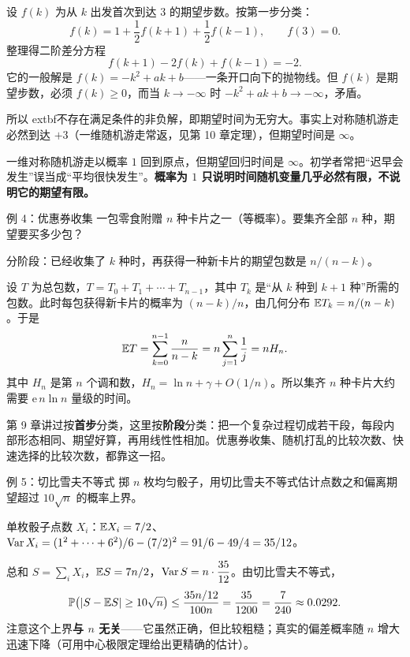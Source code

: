 \sol 设 $f(k)$ 为从 $k$ 出发首次到达 $3$ 的期望步数。按第一步分类：
\[
f(k)=1+\frac12 f(k+1)+\frac12 f(k-1),\qquad f(3)=0.
\]
整理得二阶差分方程
\[
f(k+1)-2f(k)+f(k-1)=-2.
\]
它的一般解是 $f(k)=-k^2+ak+b$——一条开口向下的抛物线。但 $f(k)$ 是期望步数，必须 $f(k)\ge0$，而当 $k\to-\infty$ 时 $-k^2+ak+b\to-\infty$，矛盾。

所以	extbf{不存在满足条件的非负解}，即期望时间为无穷大。事实上对称随机游走必然到达 $+3$（一维随机游走常返，见第 10 章定理），但期望时间是 $\infty$。

\begin{pitfall}
一维对称随机游走以概率 $1$ 回到原点，但期望回归时间是 $\infty$。初学者常把“迟早会发生”误当成“平均很快发生”。\textbf{概率为 $1$ 只说明时间随机变量几乎必然有限，不说明它的期望有限。}
\end{pitfall}

\begin{problem}{例 4：优惠券收集}
一包零食附赠 $n$ 种卡片之一（等概率）。要集齐全部 $n$ 种，期望要买多少包？
\end{problem}
\hint 分阶段：已经收集了 $k$ 种时，再获得一种新卡片的期望包数是 $n/(n-k)$。

\sol 设 $T$ 为总包数，$T=T_0+T_1+\cdots+T_{n-1}$，其中 $T_k$ 是“从 $k$ 种到 $k+1$ 种”所需的包数。此时每包获得新卡片的概率为 $(n-k)/n$，由几何分布 $\mathbb E T_k=n/(n-k)$。于是
\[
\mathbb E T=\sum_{k=0}^{n-1}\frac{n}{n-k}=n\sum_{j=1}^{n}\frac1j=nH_n.
\]
其中 $H_n$ 是第 $n$ 个调和数，$H_n=\ln n+\gamma+O(1/n)$。所以集齐 $n$ 种卡片大约需要 $\mathrm e\,n\ln n$ 量级的时间。

\begin{teach}
第 9 章讲过按\textbf{首步}分类，这里按\textbf{阶段}分类：把一个复杂过程切成若干段，每段内部形态相同、期望好算，再用线性性相加。优惠券收集、随机打乱的比较次数、快速选择的比较次数，都靠这一招。
\end{teach}

\begin{problem}{例 5：切比雪夫不等式}
掷 $n$ 枚均匀骰子，用切比雪夫不等式估计点数之和偏离期望超过 $10\sqrt n$ 的概率上界。
\end{problem}
\hint 单枚骰子点数 $X_i$：$\mathbb E X_i=7/2$、$\operatorname{Var} X_i=(1^2+\cdots+6^2)/6-(7/2)^2=91/6-49/4=35/12$。

\sol 总和 $S=\sum_iX_i$，$\mathbb E S=7n/2$，$\operatorname{Var} S=n\cdot\dfrac{35}{12}$。由切比雪夫不等式，
\[
\mathbb P\bigl(|S-\mathbb E S|\ge10\sqrt n\bigr)\le\frac{35n/12}{100n}=\frac{35}{1200}=\frac7{240}\approx0.0292.
\]
注意这个上界\textbf{与 $n$ 无关}——它虽然正确，但比较粗糙；真实的偏差概率随 $n$ 增大迅速下降（可用中心极限定理给出更精确的估计）。

